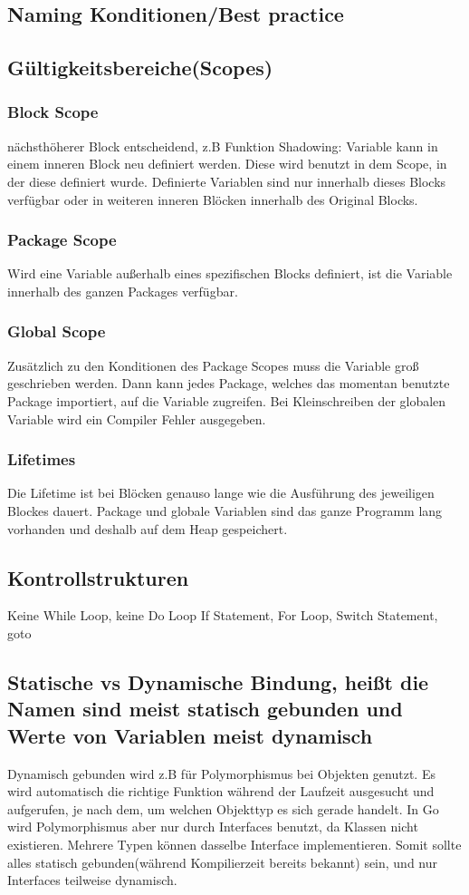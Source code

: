 \subsection{Naming Konditionen/Best practice}
\subsection{Gültigkeitsbereiche(Scopes)}
\subsubsection{Block Scope}
nächsthöherer Block entscheidend, z.B Funktion
Shadowing: Variable kann in einem inneren Block neu definiert werden. Diese wird benutzt in dem Scope, in der diese definiert wurde.
Definierte Variablen sind nur innerhalb dieses Blocks verfügbar oder in weiteren inneren Blöcken innerhalb des Original Blocks.
\subsubsection{Package Scope}
Wird eine Variable außerhalb eines spezifischen Blocks definiert, ist die Variable innerhalb des ganzen Packages verfügbar.
\subsubsection{Global Scope}
Zusätzlich zu den Konditionen des Package Scopes muss die Variable groß geschrieben werden. Dann kann jedes Package, welches das momentan benutzte Package importiert, auf die Variable zugreifen. Bei Kleinschreiben der globalen Variable wird ein Compiler Fehler ausgegeben.
\subsubsection{Lifetimes}
Die Lifetime ist bei Blöcken genauso lange wie die Ausführung des jeweiligen Blockes dauert. 
Package und globale Variablen sind das ganze Programm lang vorhanden und deshalb auf dem Heap gespeichert.
\subsection{Kontrollstrukturen}
Keine While Loop, keine Do Loop
If Statement, For Loop, Switch Statement, goto
\subsection{Statische vs Dynamische Bindung, heißt die Namen sind meist statisch gebunden und Werte von Variablen meist dynamisch}
Dynamisch gebunden wird z.B für Polymorphismus bei Objekten genutzt. Es wird automatisch die richtige Funktion während der Laufzeit ausgesucht und aufgerufen, je nach dem, um welchen Objekttyp es sich gerade handelt. 
In Go wird Polymorphismus aber nur durch Interfaces benutzt, da Klassen nicht existieren. Mehrere Typen können dasselbe Interface implementieren. Somit sollte alles statisch gebunden(während Kompilierzeit bereits bekannt) sein, und nur Interfaces teilweise dynamisch.
